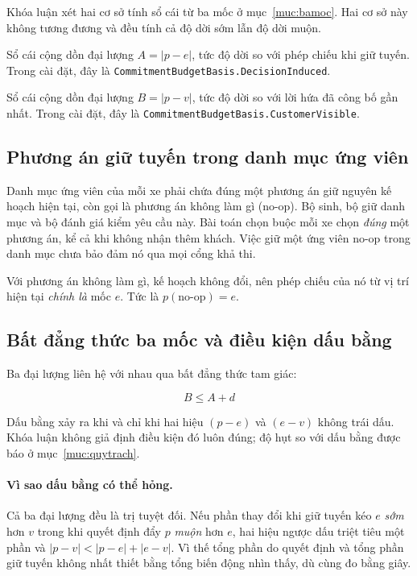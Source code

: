 Khóa luận xét hai cơ sở tính sổ cái từ ba mốc ở mục~\ref{muc:bamoc}. Hai cơ sở này không
tương đương và đều tính cả độ dời sớm lẫn độ dời muộn.

\begin{dinhnghia}[Cơ sở hành vi]
\raggedright
Sổ cái cộng dồn đại lượng $A = |p-e|$, tức độ dời so với phép chiếu khi giữ tuyến.
Trong cài đặt, đây là \texttt{CommitmentBudgetBasis.DecisionInduced}. 
\end{dinhnghia}

\begin{dinhnghia}
\raggedright
Sổ cái cộng dồn đại lượng $B = |p-v|$, tức độ dời so với lời hứa đã công bố gần nhất. Trong cài
đặt, đây là \texttt{CommitmentBudgetBasis.CustomerVisible}. 
\end{dinhnghia}

\subsection{Phương án giữ tuyến trong danh mục ứng viên}

Danh mục ứng viên của mỗi xe phải chứa đúng một phương án giữ nguyên kế hoạch hiện tại,
còn gọi là phương án không làm gì (no-op). Bộ sinh, bộ giữ danh mục và bộ đánh giá kiểm yêu
cầu này. Bài toán chọn buộc mỗi xe chọn \emph{đúng} một phương án, kể cả khi không nhận thêm
khách. Việc giữ một ứng viên no-op trong danh mục chưa bảo đảm nó qua mọi cổng khả thi.

Với phương án không làm gì, kế hoạch không đổi, nên phép chiếu của nó từ vị trí hiện tại
\emph{chính là} mốc $e$. Tức là $p(\text{no-op}) = e$.

\subsection{Bất đẳng thức ba mốc và điều kiện dấu bằng}
\label{muc:phanra}

Ba đại lượng liên hệ với nhau qua bất đẳng thức tam giác:

\begin{equation}
\boxed{\,B \le A + d\,}
\label{eq:phanra}
\end{equation}

Dấu bằng xảy ra khi và chỉ khi hai hiệu $(p-e)$ và $(e-v)$ không trái dấu. Khóa luận không
giả định điều kiện đó luôn đúng; độ hụt so với dấu bằng được báo ở mục~\ref{muc:quytrach}.

\paragraph{Vì sao dấu bằng có thể hỏng.} Cả ba đại lượng đều là trị tuyệt đối. Nếu phần thay đổi
khi giữ tuyến kéo $e$ \emph{sớm} hơn $v$ trong khi quyết định đẩy $p$ \emph{muộn} hơn $e$, hai hiệu
ngược dấu triệt tiêu một phần và $|p-v| < |p-e| + |e-v|$. Vì thế tổng phần do quyết định và
tổng phần giữ tuyến không nhất thiết bằng tổng biến động nhìn thấy, dù cùng đo bằng giây.


